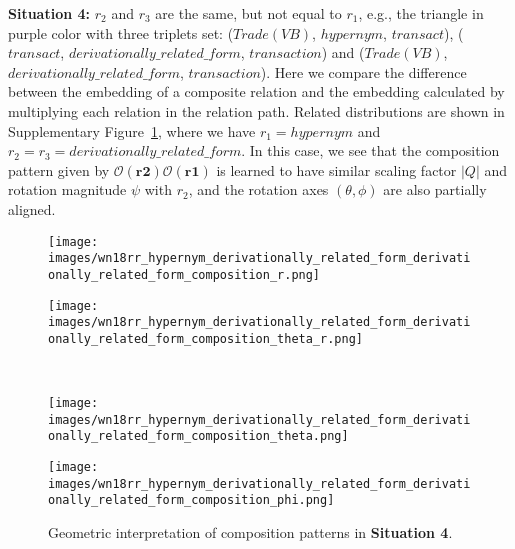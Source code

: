 \documentclass[11pt]{article}
\begin{document}
\textbf{Situation 4:} \(r_2\) and \(r_3\) are the same, but not equal to \(r_1\), e.g., the triangle in purple color with three triplets set: (\(Trade(VB)\), \(hypernym\), \(transact\)), (\(transact\), \(derivationally\_related\_form\), \(transaction\)) and (\(Trade(VB)\), \(derivationally\_related\_form\), \(transaction\)). Here we compare the difference between the embedding of a composite relation and the embedding calculated by multiplying each relation in the relation path. Related distributions are shown in Supplementary Figure~\ref{011}, where we have \(r_1=hypernym\) and \(r_2=r_3=derivationally\_related\_form\). In this case, we see that the composition pattern given by \(\mathcal{O}(\textbf{r2})\mathcal{O}(\textbf{r1})\) is learned to have similar scaling factor \(|Q|\) and rotation magnitude \(\psi\) with \(r_2\), and the rotation axes \((\theta, \phi)\) are also partially aligned.
 

\begin{figure}[htbp]
\centering
\begin{minipage}{3.5cm}
\centering
\texttt{[image: images/wn18rr\_hypernym\_derivationally\_related\_form\_derivationally\_related\_form\_composition\_r.png]}
\end{minipage}
\begin{minipage}{3.5cm}
\centering
\texttt{[image: images/wn18rr\_hypernym\_derivationally\_related\_form\_derivationally\_related\_form\_composition\_theta\_r.png]}
\end{minipage}
\\
\begin{minipage}{3.5cm}
\centering
\texttt{[image: images/wn18rr\_hypernym\_derivationally\_related\_form\_derivationally\_related\_form\_composition\_theta.png]}
\end{minipage}
\begin{minipage}{3.5cm}
\centering
\texttt{[image: images/wn18rr\_hypernym\_derivationally\_related\_form\_derivationally\_related\_form\_composition\_phi.png]}
\end{minipage}
\caption{Geometric interpretation of composition patterns in \textbf{Situation 4}.}
\label{011}
\end{figure}
\end{document}

